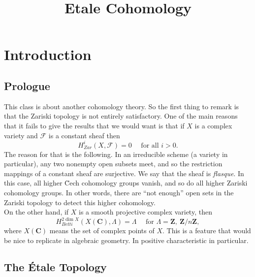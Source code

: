 

%


\title{Etale Cohomology}


\maketitle

\label{section-phantom}

\tableofcontents


\section*{Introduction}%
\subsection{Prologue}

This class is about another cohomology theory. So the first thing to remark is that the Zariski topology is not entirely satisfactory. One of the main reasons that it fails to give the results that we would want is that if $X$ is a complex variety and $\mathcal{F}$ is a constant sheaf then
$$
H_{Zar}^i ( X, \mathcal{F}) = 0 \quad \text{ for all } i>0.
$$
The reason for that is the following. In an irreducible scheme (a variety in particular), any two nonempty open subsets meet, and so the restriction mappings of a constant sheaf are surjective. We say that the sheaf is \emph{flasque}. In this case, all higher \u Cech cohomology groups vanish, and so do all higher Zariski cohomology groups. In other words, there are ``not enough'' open sets in the Zariski topology to detect this higher cohomology.
\\
On the other hand, if $X$ is a smooth projective complex variety, then
$$
H_{Betti}^{2 \dim X} (X (\mathbf{C}), \Lambda) = \Lambda \quad \text{ for } \Lambda = \mathbf{Z}, \ \mathbf{Z}/n\mathbf{Z},
$$
where $X(\mathbf{C})$ means the set of complex points of $X$. This is a feature that would be nice to replicate in algebraic geometry. In positive characteristic in particular.

\subsection{The \'Etale Topology}

